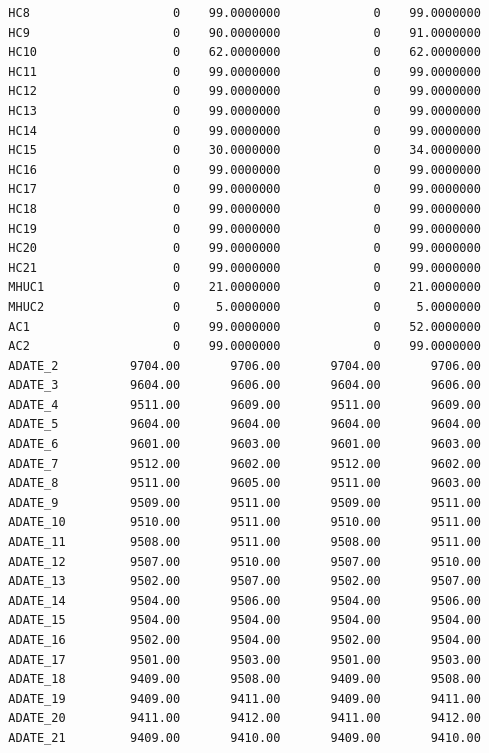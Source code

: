 \documentclass[
  11pt,
  a4paper,
  DIV=12,captions=tableheading,oneside,titlepage]{scrbook}
\begin{document}
\begin{verbatim}
  HC8                    0    99.0000000             0    99.0000000 
  HC9                    0    90.0000000             0    91.0000000 
  HC10                   0    62.0000000             0    62.0000000 
  HC11                   0    99.0000000             0    99.0000000 
  HC12                   0    99.0000000             0    99.0000000 
  HC13                   0    99.0000000             0    99.0000000 
  HC14                   0    99.0000000             0    99.0000000 
  HC15                   0    30.0000000             0    34.0000000 
  HC16                   0    99.0000000             0    99.0000000 
  HC17                   0    99.0000000             0    99.0000000 
  HC18                   0    99.0000000             0    99.0000000 
  HC19                   0    99.0000000             0    99.0000000 
  HC20                   0    99.0000000             0    99.0000000 
  HC21                   0    99.0000000             0    99.0000000 
  MHUC1                  0    21.0000000             0    21.0000000 
  MHUC2                  0     5.0000000             0     5.0000000 
  AC1                    0    99.0000000             0    52.0000000 
  AC2                    0    99.0000000             0    99.0000000 
  ADATE_2          9704.00       9706.00       9704.00       9706.00 
  ADATE_3          9604.00       9606.00       9604.00       9606.00 
  ADATE_4          9511.00       9609.00       9511.00       9609.00 
  ADATE_5          9604.00       9604.00       9604.00       9604.00 
  ADATE_6          9601.00       9603.00       9601.00       9603.00 
  ADATE_7          9512.00       9602.00       9512.00       9602.00 
  ADATE_8          9511.00       9605.00       9511.00       9603.00 
  ADATE_9          9509.00       9511.00       9509.00       9511.00 
  ADATE_10         9510.00       9511.00       9510.00       9511.00 
  ADATE_11         9508.00       9511.00       9508.00       9511.00 
  ADATE_12         9507.00       9510.00       9507.00       9510.00 
  ADATE_13         9502.00       9507.00       9502.00       9507.00 
  ADATE_14         9504.00       9506.00       9504.00       9506.00 
  ADATE_15         9504.00       9504.00       9504.00       9504.00 
  ADATE_16         9502.00       9504.00       9502.00       9504.00 
  ADATE_17         9501.00       9503.00       9501.00       9503.00 
  ADATE_18         9409.00       9508.00       9409.00       9508.00 
  ADATE_19         9409.00       9411.00       9409.00       9411.00 
  ADATE_20         9411.00       9412.00       9411.00       9412.00 
  ADATE_21         9409.00       9410.00       9409.00       9410.00 

\end{verbatim}
\end{document}
